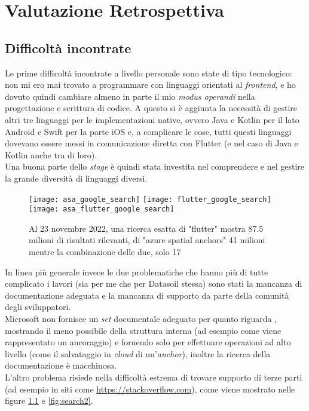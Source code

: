 
\chapter{Valutazione Retrospettiva}
\label{cap:valutazione-retrospettiva}

\section{Difficoltà incontrate}
\label{sec:difficolta_incontrate}
Le prime difficoltà incontrate a livello personale sono state di tipo tecnologico: non mi ero mai trovato a programmare con linguaggi orientati al \textit{frontend}, e ho dovuto quindi cambiare almeno in parte il mio \textit{modus operandi} nella progettazione e scrittura di codice. A questo si è aggiunta la necessità di gestire altri tre linguaggi per le implementazioni native, ovvero Java e Kotlin per il lato Android e Swift per la parte iOS e, a complicare le cose, tutti questi linguaggi dovevano essere messi in comunicazione diretta con Flutter (e nel caso di Java e Kotlin anche tra di loro).\\ 
Una buona parte dello \textit{stage} è quindi stata investita nel comprendere e nel gestire la grande diversità di linguaggi diversi.

\begin{figure}[H]
  \centering
  \texttt{[image: asa\_google\_search]}\hfill
  \texttt{[image: flutter\_google\_search]}\\
  \texttt{[image: asa\_flutter\_google\_search]}
  \caption[Ricerca esatta Flutter e ASA 23 novembre]{Al 23 novembre 2022, una ricerca esatta di "flutter" mostra 87.5 milioni di risultati rilevanti, di "azure spatial anchors" 41 milioni mentre la combinazione delle due, solo 17}
\label{fig:search1}
\end{figure}

In linea più generale invece le due problematiche che hanno più di tutte complicato i lavori (sia per me che per Datasoil stessa) sono stati la mancanza di documentazione adeguata e la mancanza di supporto da parte della comunità degli sviluppatori.\\
Microsoft non fornisce un \textit{set} documentale adeguato per quanto riguarda \asa{}, mostrando il meno possibile della struttura interna (ad esempio come viene rappresentato un ancoraggio) e fornendo solo \api{} per effettuare operazioni ad alto livello (come il salvataggio in \textit{cloud} di un'\textit{anchor}), inoltre la ricerca della documentazione è macchinosa.\\
L'altro problema risiede nella difficoltà estrema di trovare supporto di terze parti (ad esempio in siti come \url{https://stackoverflow.com}), come viene mostrato nelle figure \ref{fig:search1} e \ref{fig:search2}.

